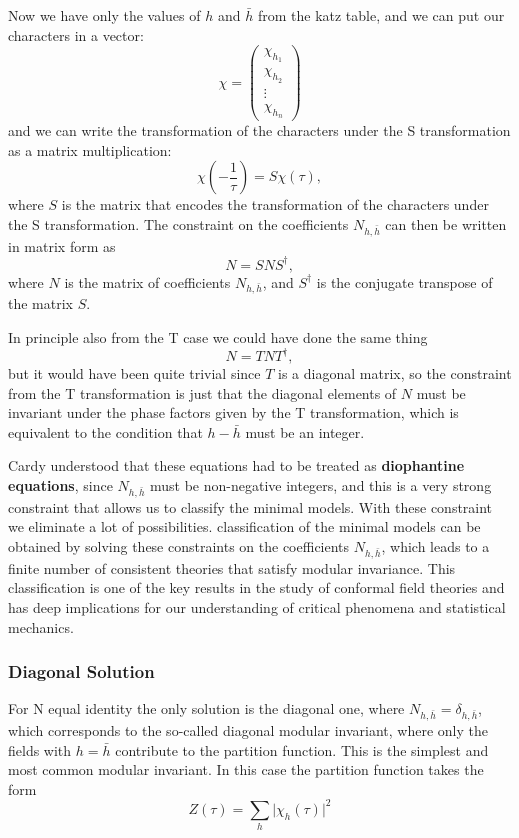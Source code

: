 Now we have only the values of \(h\) and \(\bar{h}\) from the katz table, and we can put our characters in a vector:
\[
    \chi = \begin{pmatrix}
        \chi_{h_1} \\
        \chi_{h_2} \\
        \vdots     \\
        \chi_{h_n}
    \end{pmatrix}
\]
and we can write the transformation of the characters under the S transformation as a matrix multiplication:
\[
    \chi(-\frac{1}{\tau}) = S \chi(\tau),
\]
where \(S\) is the matrix that encodes the transformation of the characters under the S transformation. The constraint on the coefficients \(N_{h,\bar{h}}\) can then be written in matrix form as
\[
    N = S N S^\dagger,
\]
where \(N\) is the matrix of coefficients \(N_{h,\bar{h}}\), and \(S^\dagger\) is the conjugate transpose of the matrix \(S\).

In principle also from the T case we could have done the same thing
\[
    N = T N T^\dagger,
\]
but it would have been quite trivial since \(T\) is a diagonal matrix, so the constraint from the T transformation is just that the diagonal elements of \(N\) must be invariant under the phase factors given by the T transformation, which is equivalent to the condition that \(h - \bar{h}\) must be an integer.

Cardy understood that these equations had to be treated as \textbf{diophantine equations}, since \(N_{h,\bar{h}}\) must be non-negative integers, and this is a very strong constraint that allows us to classify the minimal models. With these constraint we eliminate a lot of possibilities. classification of the minimal models can be obtained by solving these constraints on the coefficients \(N_{h,\bar{h}}\), which leads to a finite number of consistent theories that satisfy modular invariance. This classification is one of the key results in the study of conformal field theories and has deep implications for our understanding of critical phenomena and statistical mechanics.

\subsubsection{Diagonal Solution}
For N equal identity the only solution is the diagonal one, where \(N_{h,\bar{h}} = \delta_{h,\bar{h}}\), which corresponds to the so-called diagonal modular invariant, where only the fields with \(h = \bar{h}\) contribute to the partition function. This is the simplest and most common modular invariant. In this case the partition function takes the form
\[
    Z(\tau) = \sum_{h} \vert \chi_h(\tau) \vert^2
\]

